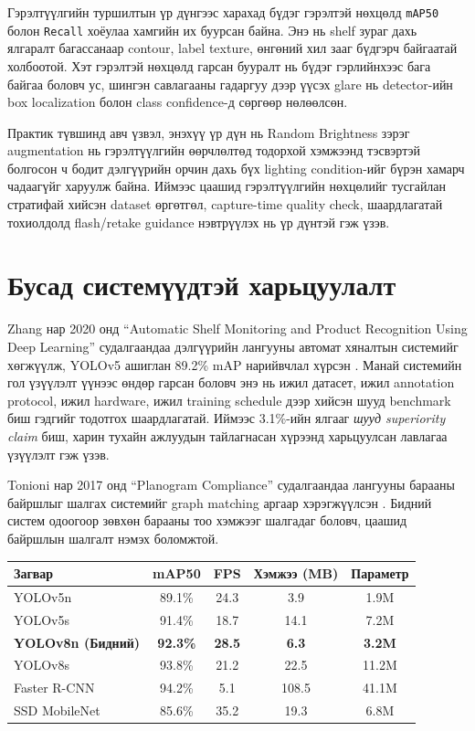 Гэрэлтүүлгийн туршилтын үр дүнгээс харахад бүдэг гэрэлтэй нөхцөлд \texttt{mAP50} болон \texttt{Recall} хоёулаа хамгийн их буурсан байна. Энэ нь shelf зураг дахь ялгаралт багассанаар contour, label texture, өнгөний хил зааг бүдгэрч байгаатай холбоотой. Хэт гэрэлтэй нөхцөлд гарсан бууралт нь бүдэг гэрлийнхээс бага байгаа боловч ус, шингэн савлагааны гадаргуу дээр үүсэх glare нь detector-ийн box localization болон class confidence-д сөргөөр нөлөөлсөн.

Практик түвшинд авч үзвэл, энэхүү үр дүн нь Random Brightness зэрэг augmentation нь гэрэлтүүлгийн өөрчлөлтөд тодорхой хэмжээнд тэсвэртэй болгосон ч бодит дэлгүүрийн орчин дахь бүх lighting condition-ийг бүрэн хамарч чадаагүйг харуулж байна. Иймээс цаашид гэрэлтүүлгийн нөхцөлийг тусгайлан стратифай хийсэн dataset өргөтгөл, capture-time quality check, шаардлагатай тохиолдолд flash/retake guidance нэвтрүүлэх нь үр дүнтэй гэж үзэв.

\section{Бусад системүүдтэй харьцуулалт}

Zhang нар 2020 онд ``Automatic Shelf Monitoring and Product Recognition Using Deep Learning'' судалгаандаа дэлгүүрийн лангууны автомат хяналтын системийг хөгжүүлж, YOLOv5 ашиглан 89.2\% mAP нарийвчлал хүрсэн \cite{shelf_monitoring}. Манай системийн гол үзүүлэлт үүнээс өндөр гарсан боловч энэ нь ижил датасет, ижил annotation protocol, ижил hardware, ижил training schedule дээр хийсэн шууд benchmark биш гэдгийг тодотгох шаардлагатай. Иймээс 3.1\%-ийн ялгааг \textit{шууд superiority claim} биш, харин тухайн ажлуудын тайлагнасан хүрээнд харьцуулсан лавлагаа үзүүлэлт гэж үзэв.

Tonioni нар 2017 онд ``Planogram Compliance'' судалгаандаа лангууны барааны байршлыг шалгах системийг graph matching аргаар хэрэгжүүлсэн \cite{planogram_compliance}. Бидний систем одоогоор зөвхөн барааны тоо хэмжээг шалгадаг боловч, цаашид байршлын шалгалт нэмэх боломжтой.

\begin{table}[H]
\centering
\caption{Бусад объект илрүүлэлтийн загваруудтай харьцуулалт}
\label{tab:model_comparison}
\begin{longtable}{|l|c|c|c|c|}
\hline
\textbf{Загвар} & \textbf{mAP50} & \textbf{FPS} & \textbf{Хэмжээ (MB)} & \textbf{Параметр} \\
\hline
YOLOv5n & 89.1\% & 24.3 & 3.9 & 1.9M \\
\hline
YOLOv5s & 91.4\% & 18.7 & 14.1 & 7.2M \\
\hline
\textbf{YOLOv8n (Бидний)} & \textbf{92.3\%} & \textbf{28.5} & \textbf{6.3} & \textbf{3.2M} \\
\hline
YOLOv8s & 93.8\% & 21.2 & 22.5 & 11.2M \\
\hline
Faster R-CNN & 94.2\% & 5.1 & 108.5 & 41.1M \\
\hline
SSD MobileNet & 85.6\% & 35.2 & 19.3 & 6.8M \\
\hline
\end{longtable}
\end{table}

